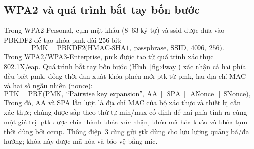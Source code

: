 \subsection{WPA2 và quá trình bắt tay bốn bước}

Trong WPA2-Personal, cụm mật khẩu (8--63 ký tự) và \ac{ssid} được đưa vào
PBKDF2 để tạo khóa \ac{pmk} dài 256 bit:
\begin{equation}
  \mathrm{PMK} = \mathrm{PBKDF2}\bigl( \text{HMAC-SHA1},\ \text{passphrase},\ \text{SSID},\ 4096,\ 256 \bigr).
\end{equation}
Trong WPA2/WPA3-Enterprise, \ac{pmk} được tạo từ quá trình xác thực
802.1X/\ac{eap}. Quá trình bắt tay bốn bước (Hình~\ref{fig:4way}) xác nhận cả
hai phía đều biết \ac{pmk}, đồng thời dẫn xuất khóa phiên mới \ac{ptk} từ
\ac{pmk}, hai địa chỉ MAC và hai số ngẫu nhiên (nonce):
\begin{equation}
  \mathrm{PTK} = \mathrm{PRF}\bigl( \mathrm{PMK},\ \text{``Pairwise key expansion''},\ \mathrm{AA}\,\|\,\mathrm{SPA}\,\|\,\mathrm{ANonce}\,\|\,\mathrm{SNonce} \bigr),
\end{equation}
Trong đó, AA và SPA lần lượt là địa chỉ MAC của bộ xác thực và thiết bị cần
xác thực; chúng được sắp theo thứ tự min/max cố định để hai phía tính ra cùng
một giá trị. \ac{ptk} được chia thành khóa xác nhận, khóa mã hóa khóa và khóa
tạm thời dùng bởi \ac{ccmp}. Thông điệp~3 cũng gửi \ac{gtk} dùng cho lưu lượng
quảng bá/đa hướng; khóa này được mã hóa và bảo vệ bằng \ac{mic}.

